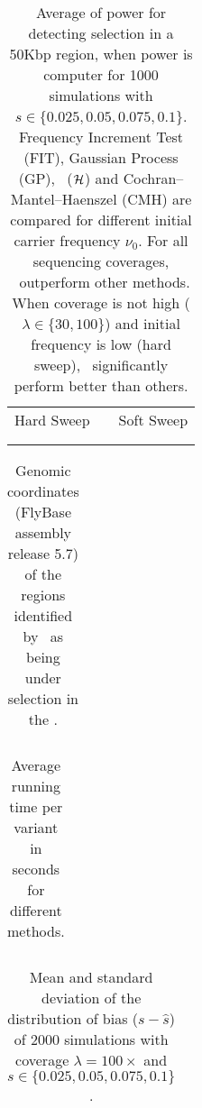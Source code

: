 \begin{table}[h]
	\centering
	\begin{tabular}{ccc}
		Hard Sweep & &Soft Sweep\\ \\  
		
		&&
	\end{tabular}
        \caption{Average of power for detecting selection in a 50Kbp region, 
        when power is computer for 1000 simulations with 
        $s\in\{0.025,0.05,0.075,0.1\}$. Frequency Increment 
        Test (FIT), Gaussian Process (GP), \comale\ (${\cal H}$) and 
        Cochran–Mantel–Haenszel (CMH) are compared for different initial 
        carrier frequency $\nu_0$. For all sequencing coverages, \comale\ 
        outperform other methods. When coverage is not high 
        ($\lambda\in\{30,100\}$) and initial frequency is low (hard sweep), 
        \comale\ significantly perform better than others.}
\label{tab:power}
\end{table}


\begin{table}[h]
	\centering
	\begin{tabular}{c}
		
	\end{tabular}
	\caption{Genomic coordinates (FlyBase assembly release 5.7) of the regions 
		identified by \comale\ as being under selection in the 
		\datadm.}\label{tab:intervals}
\end{table}

\begin{table}[h]
	\centering
	\begin{tabular}{c}
		
	\end{tabular}
	\caption{Average running time per variant in seconds for different 
	methods.}\label{tab:times}
\end{table}

\begin{table}[h]
	\centering
	\begin{tabular}{c}
		
	\end{tabular}
	\caption{Mean and standard deviation of the distribution of bias 
	($s-\hat{s}$) of 2000 simulations with coverage $\lambda=100\times$ and 
	$s\in\{0.025,0.05,0.075,0.1\}$.}\label{tab:biasdist}
\end{table}